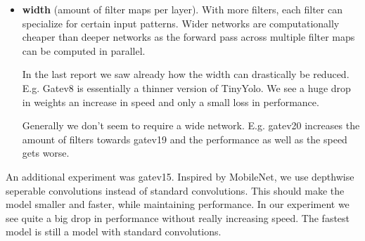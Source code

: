 \documentclass{article}
\begin{document}
\begin{itemize}
	
	\item \textbf{width} (amount of filter maps per layer). With more filters, each filter can specialize for certain input patterns. Wider networks are computationally cheaper than deeper networks as the forward pass across multiple filter maps can be computed in parallel.
	
	In the last report we saw already how the width can drastically be reduced. E.g. Gatev8 is essentially a thinner version of TinyYolo. We see a huge drop in weights an increase in speed and only a small loss in performance.
	
	Generally we don't seem to require a wide network. E.g. gatev20 increases the amount of filters towards gatev19 and the performance as well as the speed gets worse. 

\end{itemize}

An additional experiment was gatev15. Inspired by MobileNet, we use depthwise seperable convolutions instead of standard convolutions. This should make the model smaller and faster, while maintaining performance. In our experiment we see quite a big drop in performance without really increasing speed. The fastest model is still a model with standard convolutions.
\end{document}
